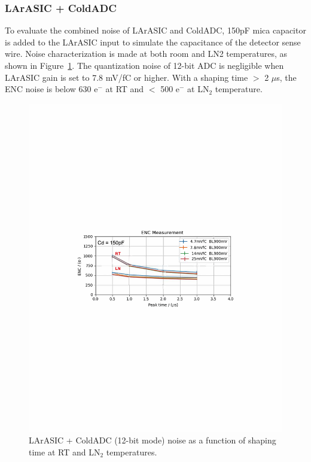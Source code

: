 \subsubsection{LArASIC + ColdADC}
To evaluate the combined noise of LArASIC and ColdADC, 150pF mica capacitor is added to the LArASIC input 
to simulate the capacitance of the detector sense wire. 
Noise characterization is made at both room and LN2 temperatures, as shown in Figure~\ref{fig:noise_fullchain}.  
The quantization noise of 12-bit ADC is negligible when LArASIC gain is set to 7.8 mV/fC or higher.
With a shaping time $>$ 2 $\mu$s, the ENC noise is below 630 e$^-$ at RT and $<$ 500 e$^-$ at LN$_2$ temperature.
\begin{figure}[h!]
\centering
  \includegraphics[width=0.8\linewidth]{figures/noise_fullchain.pdf}
  \caption{LArASIC + ColdADC (12-bit mode) noise as a function of shaping time at RT and LN$_2$ temperatures.}
  \label{fig:noise_fullchain}
\end{figure}

